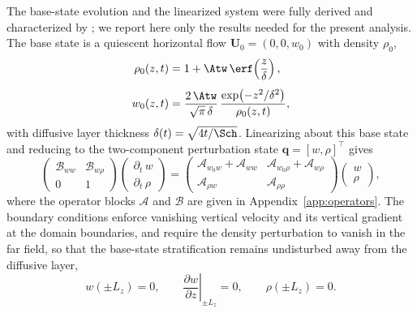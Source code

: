 The base-state evolution and the linearized system were fully derived and characterized by \citet{kola-israel-towne-2026}; we report here only the results needed for the present analysis. The base state is a quiescent horizontal flow \(\boldsymbol{U}_0 = (0, 0, w_0)\) with density \(\rho_0\),
\begin{subequations}\label{eq:vd_base_state}
\begin{align}
    \rho_{0}(z,t) &= 1 + \Atw\,\erf\!\left(\frac{z}{\delta}\right), \label{eq:vd_base_state_rho0} \\[4pt]
    w_0(z,t) &= \frac{2\,\Atw}{\sqrt{\pi}\,\delta}\,
               \frac{\exp\!\left(-z^2/\delta^2\right)}{\rho_0(z,t)},
               \label{eq:vd_base_state_w0}
\end{align}
\end{subequations}
with diffusive layer thickness \(\delta(t)=\sqrt{4t/\Sch}\). Linearizing about this base state and reducing to the two-component perturbation state \(\boldsymbol{q} = [w, \rho]^\top\) gives
\begin{equation}
    \label{eq:vd_lin_continuous}
    \begin{pmatrix}
        \mathscr{B}_{ww} & \mathscr{B}_{w\rho} \\
        0 & 1
    \end{pmatrix}
    \begin{pmatrix}
        \partial_t\, w \\[4pt]
        \partial_t\,\rho
    \end{pmatrix}
    =
    \begin{pmatrix}
        \mathscr{A}_{w_0w}+\mathscr{A}_{ww} & \mathscr{A}_{w_0\rho}+\mathscr{A}_{w\rho} \\[4pt]
        \mathscr{A}_{\rho w} & \mathscr{A}_{\rho\rho}
    \end{pmatrix}
    \begin{pmatrix}
        w \\[4pt]
        \rho
    \end{pmatrix},
\end{equation}
where the operator blocks \(\mathscr{A}\) and \(\mathscr{B}\) are given in Appendix~\ref{app:operators}. The boundary conditions enforce vanishing vertical velocity and its vertical gradient at the domain boundaries, and require the density perturbation to vanish in the far field, so that the base-state stratification remains undisturbed away from the diffusive layer,
\begin{equation}
    \label{eq:vd_boundary_conditions}
    w(\pm L_z) = 0, \qquad \left.\frac{\partial w}{\partial z}\right|_{\pm L_z} = 0, \qquad
    \rho(\pm L_z) = 0.
\end{equation}
